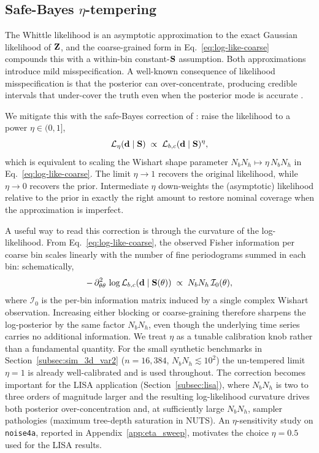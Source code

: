 \documentclass[%
	reprint,
	nofootinbib,
	amsmath,
	amssymb,
	aps,
]{revtex4-2}
\begin{document}
	\subsection{Safe-Bayes $\eta$-tempering}
	\label{subsec:eta}
	The Whittle likelihood is an asymptotic approximation to the exact Gaussian
	likelihood of $\Z$, and the coarse-grained form in
	Eq.~\eqref{eq:log-like-coarse} compounds this with a within-bin
	constant-$\S$ assumption. Both approximations introduce mild
	misspecification. A well-known consequence of likelihood misspecification is
	that the posterior can over-concentrate, producing credible intervals that
	under-cover the truth even when the posterior mode is accurate
	\citep{grunwald2019}.

	We mitigate this with the safe-Bayes correction of
	\citet{grunwald2019}: raise the likelihood to a power $\eta\in(0,1]$,
	\begin{equation}
		\label{eq:eta-tempered}
		\mathcal{L}_{\eta}(\d\mid\S) \;\propto\; \mathcal{L}_{b,c}(\d\mid\S)^{\eta},
	\end{equation}
	which is equivalent to scaling the Wishart shape parameter
	$N_{b}N_{h}\mapsto \eta\,N_{b}N_{h}$ in
	Eq.~\eqref{eq:log-like-coarse}. The limit $\eta\to 1$ recovers the
	original likelihood, while $\eta\to 0$ recovers the prior. Intermediate
	$\eta$ down-weights the (asymptotic) likelihood relative to the prior in
	exactly the right amount to restore nominal coverage when the
	approximation is imperfect.

	A useful way to read this correction is through the curvature of the
	log-likelihood. From Eq.~\eqref{eq:log-like-coarse}, the observed
	Fisher information per coarse bin scales linearly with the number of
	fine periodograms summed in each bin: schematically,
	\begin{equation}
		\label{eq:fisher-scaling}
		-\,\partial^{2}_{\theta\theta}\,\log\mathcal{L}_{b,c}(\d\mid\S(\theta))
		\;\propto\; N_{b}N_{h}\,\mathcal{I}_{0}(\theta),
	\end{equation}
	where $\mathcal{I}_{0}$ is the per-bin information matrix induced by
	a single complex Wishart observation. Increasing either blocking or
	coarse-graining therefore sharpens the log-posterior by the same
	factor $N_{b}N_{h}$, even though the underlying time series carries
	no additional information. We treat $\eta$ as a tunable calibration
	knob rather than a fundamental quantity. For the small synthetic
	benchmarks in Section~\ref{subsec:sim_3d_var2}
	($n=16{,}384$, $N_{b}N_{h}\!\lesssim\!10^{2}$) the un-tempered limit
	$\eta=1$ is already well-calibrated and is used throughout. The
	correction becomes important for the LISA application
	(Section~\ref{subsec:lisa}), where $N_{b}N_{h}$ is two to three orders
	of magnitude larger and the resulting log-likelihood curvature drives
	both posterior over-concentration and, at sufficiently large
	$N_{b}N_{h}$, sampler pathologies (maximum tree-depth saturation in
	NUTS). An $\eta$-sensitivity study on \texttt{noise4a}, reported in
	Appendix~\ref{app:eta_sweep}, motivates the choice $\eta=0.5$ used
	for the LISA results.
\end{document}
